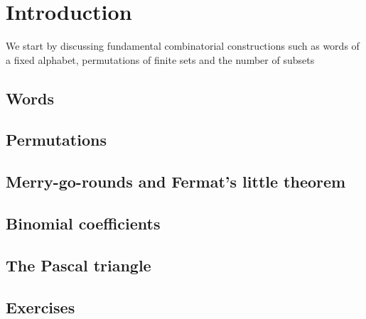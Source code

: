\section{Introduction}\label{introduction} 

We start by discussing fundamental combinatorial constructions such as words of a fixed alphabet, permutations of finite
sets and the number of subsets 

\subsection{Words}

\subsection{Permutations}

\subsection{Merry-go-rounds and Fermat's little theorem}

\subsection{Binomial coefficients}

\subsection{The Pascal triangle}

\subsection{Exercises}